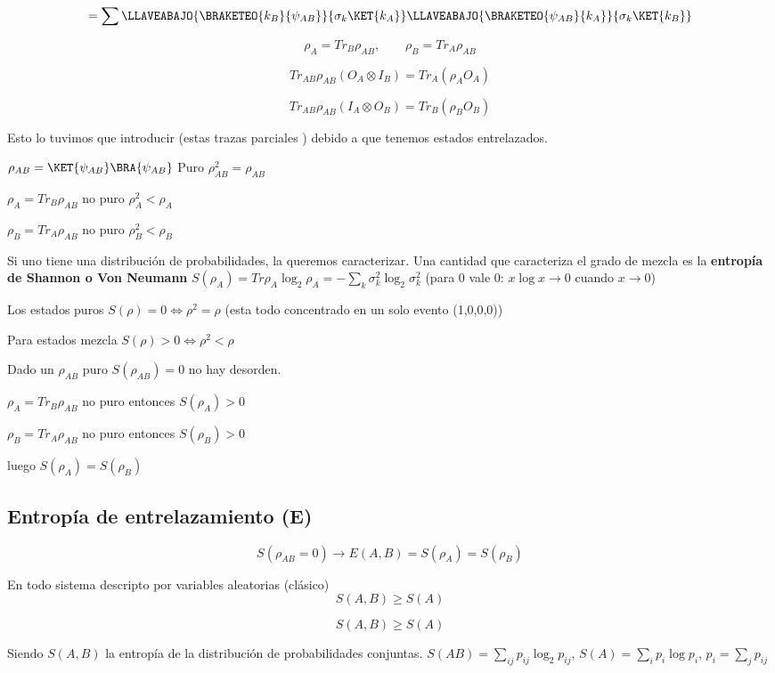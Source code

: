 \[
=\sum\LLAVEABAJO{\BRAKETEO{k_{B}}{\psi_{AB}}}{\sigma_{k}\KET{k_{A}}}\LLAVEABAJO{\BRAKETEO{\psi_{AB}}{k_{A}}}{\sigma_{k}\KET{k_{B}}}
\]

\[
\rho_{A}=Tr_{B}\rho_{AB},\qquad\rho_{B}=Tr_{A}\rho_{AB}
\]

\[
Tr_{AB}\rho_{AB}(O_{A}\otimes I_{B})=Tr_{A}(\rho_{A}O_{A})
\]

\[
Tr_{AB}\rho_{AB}(I_{A}\otimes O_{B})=Tr_{B}(\rho_{B}O_{B})
\]

Esto lo tuvimos que introducir (estas trazas parciales ) debido a
que tenemos estados entrelazados.

$\rho_{AB}=\KET{\psi_{AB}}\BRA{\psi_{AB}}$ Puro $\rho_{AB}^{2}=\rho_{AB}$

$\rho_{A}=Tr_{B}\rho_{AB}$ no puro $\rho_{A}^{2}<\rho_{A}$

$\rho_{B}=Tr_{A}\rho_{AB}$ no puro $\rho_{B}^{2}<\rho_{B}$

Si uno tiene una distribución de probabilidades, la queremos caracterizar.
Una cantidad que caracteriza el grado de mezcla es la \textbf{entropía
de Shannon o Von Neumann} $S(\rho_{A})=Tr\rho_{A}\log_{2}\rho_{A}=-\sum_{k}\sigma_{k}^{2}\log_{2}\sigma_{k}^{2}$
(para 0 vale 0: $x\log x\rightarrow0$ cuando $x\rightarrow0$)

Los estados puros $S(\rho)=0\iff\rho^{2}=\rho$ (esta todo concentrado
en un solo evento (1,0,0,0))

Para estados mezcla $S(\rho)>0\iff\rho^{2}<\rho$

Dado un $\rho_{AB}$ puro $S(\rho_{AB})=0$ no hay desorden.

$\rho_{A}=Tr_{B}\rho_{AB}$ no puro entonces $S(\rho_{A})>0$

$\rho_{B}=Tr_{A}\rho_{AB}$ no puro entonces $S(\rho_{B})>0$

luego $S(\rho_{A})=S(\rho_{B})$ 

\subsection{Entropía de entrelazamiento (E)}

\[
S(\rho_{AB}=0)\rightarrow E(A,B)=S(\rho_{A})=S(\rho_{B})
\]

En todo sistema descripto por variables aleatorias (clásico)
\[
S(A,B)\geq S(A)
\]

\[
S(A,B)\geq S(A)
\]

Siendo $S(A,B)$ la entropía de la distribución de probabilidades
conjuntas. $S(AB)=\sum_{ij}p_{ij}\log_{2}p_{ij}$, $S(A)=\sum_{i}p_{i}\log p_{i}$,
$p_{i}=\sum_{j}p_{ij}$

